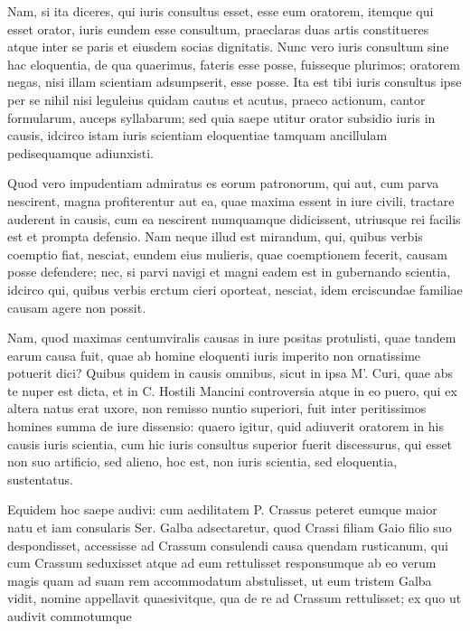  Nam, si ita diceres, qui iuris consultus esset, esse eum oratorem, itemque qui esset orator, iuris eundem esse consultum, praeclaras duas artis constitueres atque inter se paris et eiusdem socias dignitatis. Nunc vero iuris consultum sine hac eloquentia, de qua quaerimus, fateris esse posse, fuisseque plurimos; oratorem negas, nisi illam scientiam adsumpserit, esse posse. Ita est tibi iuris consultus ipse per se nihil nisi leguleius quidam cautus et acutus, praeco actionum, cantor formularum, auceps syllabarum; sed quia saepe utitur orator subsidio iuris in causis, idcirco istam iuris scientiam eloquentiae tamquam ancillulam pedisequamque adiunxisti.

 Quod vero impudentiam admiratus es eorum patronorum, qui aut, cum parva nescirent, magna profiterentur aut ea, quae maxima essent in iure civili, tractare auderent in causis, cum ea nescirent numquamque didicissent, utriusque rei facilis est et prompta defensio. Nam neque illud est mirandum, qui, quibus verbis coemptio fiat, nesciat, eundem eius mulieris, quae coemptionem fecerit, causam posse defendere; nec, si parvi navigi et magni eadem est in gubernando scientia, idcirco qui, quibus verbis erctum cieri oporteat, nesciat, idem erciscundae familiae causam agere non possit.

 Nam, quod maximas centumviralis causas in iure positas protulisti, quae tandem earum causa fuit, quae ab homine eloquenti iuris imperito non ornatissime potuerit dici? Quibus quidem in causis omnibus, sicut in ipsa M'. Curi, quae abs te nuper est dicta, et in C. Hostili Mancini controversia atque in eo puero, qui ex altera natus erat uxore, non remisso nuntio superiori, fuit inter peritissimos homines summa de iure dissensio: quaero igitur, quid adiuverit oratorem in his causis iuris scientia, cum hic iuris consultus superior fuerit discessurus, qui esset non suo artificio, sed alieno, hoc est, non iuris scientia, sed eloquentia, sustentatus.

 Equidem hoc saepe audivi: cum aedilitatem P. Crassus peteret eumque maior natu et iam consularis Ser. Galba adsectaretur, quod Crassi filiam Gaio filio suo despondisset, accessisse ad Crassum consulendi causa quendam rusticanum, qui cum Crassum seduxisset atque ad eum rettulisset responsumque ab eo verum magis quam ad suam rem accommodatum abstulisset, ut eum tristem Galba vidit, nomine appellavit quaesivitque, qua de re ad Crassum rettulisset; ex quo ut audivit commotumque

